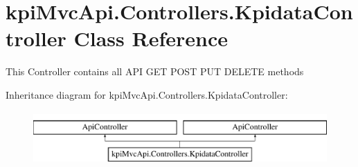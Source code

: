\hypertarget{classkpi_mvc_api_1_1_controllers_1_1_kpidata_controller}{}\section{kpi\+Mvc\+Api.\+Controllers.\+Kpidata\+Controller Class Reference}
\label{classkpi_mvc_api_1_1_controllers_1_1_kpidata_controller}


This Controller contains all A\+PI G\+ET P\+O\+ST P\+UT D\+E\+L\+E\+TE methods  


Inheritance diagram for kpi\+Mvc\+Api.\+Controllers.\+Kpidata\+Controller\+:\begin{figure}[H]
\begin{center}
\leavevmode
\includegraphics[height=2.000000cm]{classkpi_mvc_api_1_1_controllers_1_1_kpidata_controller}
\end{center}
\end{figure}
